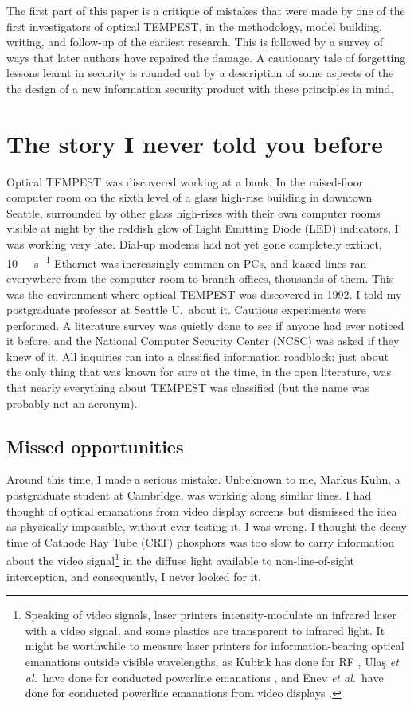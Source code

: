 \documentclass[conference]{IEEEtran}
\begin{document}
The first part of this paper is a critique of mistakes that were made by one
of the first investigators of optical TEMPEST, in the methodology, model
building, writing, and follow-up of the earliest research. This is followed
by a survey of ways that later authors have repaired the damage. A cautionary
tale of forgetting lessons learnt in security is rounded out by a description
of some aspects of the the design of a new information security product with
these principles in mind.

\section{The story I never told you before}

Optical TEMPEST was discovered working at a bank. In the raised-floor
computer room on the sixth level of a glass high-rise building in downtown
Seattle, surrounded by other glass high-rises with their own computer rooms
visible at night by the reddish glow of Light Emitting Diode (LED)
indicators, I was working very late. Dial-up modems had not yet gone
completely extinct, \SI{10}{\mega\bit\per\second} Ethernet was increasingly
common on PCs, and leased lines ran everywhere from the computer room to
branch offices, thousands of them. This was the environment where optical
TEMPEST was discovered in 1992. I told my postgraduate professor at Seattle
U.\ about it. Cautious experiments were performed. A literature survey was
quietly done to see if anyone had ever noticed it before, and the National
Computer Security Center (NCSC) was asked if they knew of it. All inquiries
ran into a classified information roadblock; just about the only thing that
was known for sure at the time, in the open literature, was that nearly
everything about TEMPEST was classified (but the name was probably not an
acronym).

\subsection{Missed opportunities}

Around this time, I made a serious mistake. Unbeknown to me, Markus Kuhn, a
postgraduate student at Cambridge, was working along similar lines. I had
thought of optical emanations from video display screens but dismissed the
idea as physically impossible, without ever testing it. I was wrong. I
thought the decay time of Cathode Ray Tube (CRT) phosphors was too slow to
carry information about the video signal\footnote{Speaking of video signals,
laser printers intensity-modulate an infrared laser with a video signal, and
some plastics are transparent to infrared light. It might be worthwhile to
measure laser printers for information-bearing optical emanations outside
visible wavelengths, as Kubiak has done for RF
\cite{Kubiak2014,Kubiak2017,Kubiak2017b,Kubiak2017c}, Ula\c{s} {\it et al.}\
have done for conducted powerline emanations \cite{Ulas2016}, and Enev {\it
et al.}\ have done for conducted powerline emanations from video displays
\cite{Enev2011}.} in the diffuse light available to non-line-of-sight
interception, and consequently, I never looked for it.
\end{document}
